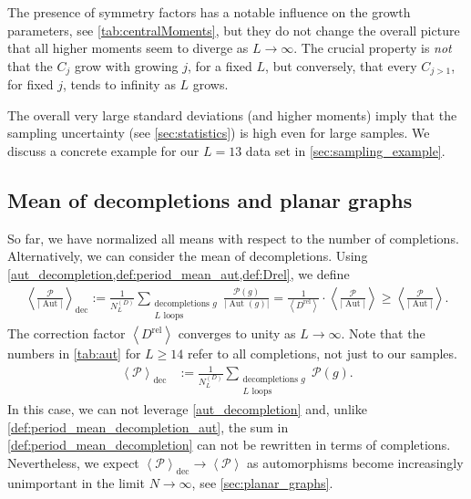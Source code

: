 \documentclass[12pt,a4paper]{article}
\newcommand{\abs}[1]{\lvert #1 \rvert}
\newcommand{\period}{\mathcal P}
\newcommand{\Aut}{\operatorname{Aut}}
\renewcommand{\|}{\rule[-0.4ex]{0.2ex}{1.2em}}
\begin{document}
The presence of symmetry factors has a notable influence on the growth parameters, see \cref{tab:centralMoments}, but they do not change the overall picture that all higher moments seem to diverge as $L\rightarrow \infty$. 
The crucial property is \emph{not} that the $C_j$ grow with growing $j$, for a fixed $L$, but conversely, that every $C_{j>1}$, for fixed $j$, tends to infinity as $L$ grows.

The overall very large standard deviations (and higher moments) imply that the sampling uncertainty (see \cref{sec:statistics}) is high even for large samples. We discuss a concrete example for our $L=13$ data set in \cref{sec:sampling_example}.

\subsection{Mean of decompletions and planar graphs}\label{sec:mean_decompletions}

So far, we have normalized all means with respect to the number of completions. Alternatively, we can consider the mean of decompletions. Using \cref{aut_decompletion,def:period_mean_aut,def:Drel}, we define 
\begin{align}\label{def:period_mean_decompletion_aut}
\left \langle \frac{\period  }{\abs{\Aut }} \right \rangle _\text{dec} := \frac{1}{  N^{(D)}_L  } \sum_{\substack{ \text{decompletions }g \\ L \text{ loops} }} \frac{\period (g)}{\abs{\Aut (g)}} = 	\frac 1 {\left \langle D^\text{rel}\right \rangle} \cdot \left \langle \frac{\period}{\abs{\Aut}}  \right \rangle \geq \left \langle \frac{\period}{\abs{\Aut}}  \right \rangle .
\end{align}
The correction factor $\left \langle D^\text{rel} \right \rangle $ converges to unity as $L \rightarrow \infty$. Note that the numbers in  \cref{tab:aut} for $L \geq 14$ refer to all completions, not just to our samples. 
\begin{align}\label{def:period_mean_decompletion}
	\left \langle \period    \right \rangle _\text{dec} &:= \frac{1}{  N^{(D)}_L  } \sum_{\substack{ \text{decompletions }g \\ L \text{ loops} }}  \period (g) .
\end{align}
In this case, we can not leverage \cref{aut_decompletion} and, unlike \cref{def:period_mean_decompletion_aut}, the sum in \cref{def:period_mean_decompletion} can not be rewritten in terms of completions. Nevertheless, we expect $\left \langle \period \right \rangle_\text{dec} \rightarrow \left \langle \period \right \rangle $ as automorphisms become increasingly unimportant in the limit $N \rightarrow \infty$, see \cref{sec:planar_graphs}.
\end{document}

